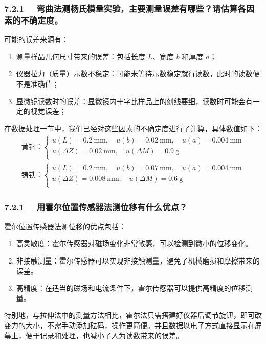 \documentclass[UTF8]{article}
\theoremstyle{MyLineTheoremStyle} %
\theoremstyle{MyBlockTheoremStyle} %
\theoremstyle{MySubsubsectionStyle} %
\begin{document}
\subsubsection*{7.2.1 \ \ 弯曲法测杨氏模量实验，主要测量误差有哪些？请估算各因素的不确定度。}
\noindent 可能的误差来源有：
\begin{enumerate}
\item 测量样品几何尺寸带来的误差：包括长度 $L$、宽度 $b$ 和厚度 $a$；
\item 仪器拉力（质量）示数不稳定：可能未等待示数稳定就行读数，此时的读数便不是准确值；
\item 显微镜读数时的误差：显微镜内十字比样品上的刻线要细，读数时可能会有一定的视觉误差；
\end{enumerate}
在数据处理一节中，我们已经对这些因素的不确定度进行了计算，具体数值如下：
\begin{gather}
\text{黄铜：}
\begin{cases}
    u(L) = 0.2 \ \mathrm{mm},\quad u(b) = 0.02 \ \mathrm{mm},\quad u(a) = 0.004 \ \mathrm{mm} \\
    u(\Delta Z) = 0.02 \ \mathrm{mm},\quad u(\Delta M) = 0.9 \ \mathrm{g} \\ 
\end{cases}
\\
\text{铸铁：}
\begin{cases}
    u(L) = 0.2 \ \mathrm{mm},\quad u(b) = 0.07 \ \mathrm{mm},\quad u(a) = 0.004 \ \mathrm{mm} \\
    u(\Delta Z) = 0.008 \ \mathrm{mm},\quad u(\Delta M) = 0.6 \ \mathrm{g} \\ 
\end{cases} 
\end{gather}

\subsubsection*{7.2.1 \ \ 用霍尔位置传感器法测位移有什么优点？}
霍尔位置传感器法测位移的优点包括：
\begin{enumerate}
\item 高灵敏度：霍尔传感器对磁场变化非常敏感，可以检测到微小的位移变化。
\item 非接触测量：霍尔传感器可以实现非接触测量，避免了机械磨损和摩擦带来的误差。
\item 高精度：在适当的磁场和电流条件下，霍尔传感器可以提供高精度的位移测量。
\end{enumerate}
特别地，与拉伸法中的测量方法相比，霍尔法只需搭建好仪器后调节旋钮，即可改变力的大小，不需手动添加砝码，操作更简便。并且数据以电子方式直接显示在屏幕上，便于记录和处理，也减小了人为读数带来的误差。
\end{document}
